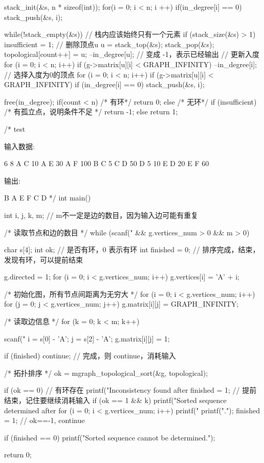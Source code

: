 \begin{Codex}[label=poj_1094.c]
{    stack_init(&s, n * sizeof(int));
    for(i = 0; i < n; i ++) {
        if(in_degree[i] == 0) {
            stack_push(&s, i);
        }
    }

    while(!stack_empty(&s)) {
        // 栈内应该始终只有一个元素
        if (stack_size(&s) > 1) insufficient = 1;
        // 删除顶点u
        u = stack_top(&s); stack_pop(&s);
        topological[count++] = u;
        --in_degree[u];  // 变成 -1，表示已经输出
        // 更新入度
        for (i = 0; i < n; i++) if (g->matrix[u][i] < GRAPH_INFINITY) {
            --in_degree[i];
        }
        // 选择入度为0的顶点
        for (i = 0; i < n; i++) if (g->matrix[u][i] < GRAPH_INFINITY) {
            if (in_degree[i] == 0) stack_push(&s, i);
        }
    }

    free(in_degree);
    if(count < n) { /* 有环*/
        return 0;
    } else { /* 无环*/
        if (insufficient) {  /* 有孤立点，说明条件不足 */
            return -1;
        } else {
            return 1;
        }
    }
}


/* test

输入数据:

6 8
A C 10
A E 30
A F 100
B C 5
C D 50
D 5 10
E D 20
E F 60

输出:

B A E F C D
*/
int main() {
    int i, j, k, m;  // m不一定是边的数目，因为输入边可能有重复

    /* 读取节点和边的数目 */
    while (scanf("%
            && g.vertices_num > 0 && m > 0) {
        char s[4];
        int ok;  // 是否有环，0 表示有环
        int finished = 0;  // 排序完成，结束，发现有环，可以提前结束

        g.directed = 1;
        for (i = 0; i < g.vertices_num; i++) g.vertices[i] = 'A' + i;

        /* 初始化图，所有节点间距离为无穷大 */
        for (i = 0; i < g.vertices_num; i++) {
            for (j = 0; j < g.vertices_num; j++) {
                g.matrix[i][j] = GRAPH_INFINITY;
            }
        }

        /* 读取边信息 */
        for (k = 0; k < m; k++) {
            scanf("%
            i = s[0] - 'A';
            j = s[2] - 'A';
            g.matrix[i][j] = 1;

            if (finished) continue;    // 完成，则 continue，消耗输入

            /* 拓扑排序 */
            ok = mgraph_topological_sort(&g, topological);

            if (ok == 0) {  // 有环存在
                printf("Inconsistency found after %
                finished = 1;  // 提前结束，记住要继续消耗输入
            }
            if (ok == 1 && k) {
                printf("Sorted sequence determined after %
                for (i = 0; i < g.vertices_num; i++) {
                    printf("%
                }
                printf(".\n");
                finished = 1;
            }
            // ok==-1, continue
        }
        if (finished == 0) {
            printf("Sorted sequence cannot be determined.\n");
        }
    }
    return 0;
}
\end{Codex}

